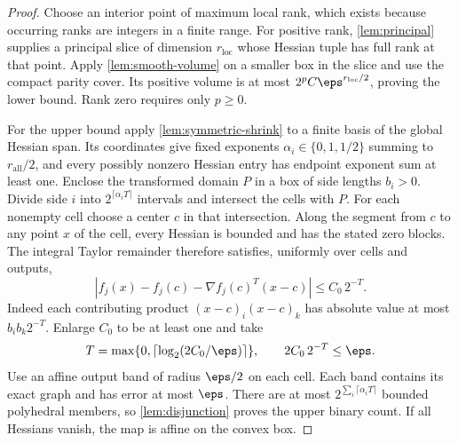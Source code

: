 \begin{proof}
Choose an interior point of maximum local rank, which exists because
occurring ranks are integers in a finite range. For positive rank,
\cref{lem:principal} supplies a principal slice of dimension
$r_{\mathrm{loc}}$ whose Hessian tuple has full rank at that point.
Apply \cref{lem:smooth-volume} on a smaller box in the slice and use
the compact parity cover. Its positive volume is at most
$2^pC\eps^{r_{\mathrm{loc}}/2}$, proving the lower bound. Rank zero
requires only $p\ge0$.

For the upper bound apply \cref{lem:symmetric-shrink} to a finite
basis of the global Hessian span. Its coordinates give fixed exponents
$\alpha_i\in\{0,1,1/2\}$ summing to $r_{\mathrm{all}}/2$, and every
possibly nonzero Hessian entry has endpoint exponent sum at least one.
Enclose the transformed domain $P$ in a box of side lengths $b_i>0$.
Divide side $i$ into $2^{\lceil\alpha_iT\rceil}$ intervals and intersect
the cells with $P$. For each nonempty cell choose a center $c$ in that
intersection. Along the segment from $c$ to any point $x$ of the cell,
every Hessian is bounded and has the stated zero blocks. The integral
Taylor remainder therefore satisfies, uniformly over cells and outputs,
\[
 |f_j(x)-f_j(c)-\nabla f_j(c)^T(x-c)|\le C_0\,2^{-T}.
\]
Indeed each contributing product $(x-c)_i(x-c)_k$ has absolute value
at most $b_i b_k2^{-T}$. Enlarge $C_0$ to be at least one and take
\[
 T=\max\{0,\lceil\log_2(2C_0/\eps)\rceil\},
 \qquad 2C_0\,2^{-T}\le\eps.
\]
Use an affine
output band of radius $\eps/2$ on each cell. Each band contains its
exact graph and has error at most $\eps$. There are at most
$2^{\sum_i\lceil\alpha_iT\rceil}$ bounded polyhedral members, so
\cref{lem:disjunction} proves the upper binary count. If all Hessians
vanish, the map is affine on the convex box.


\end{proof}
